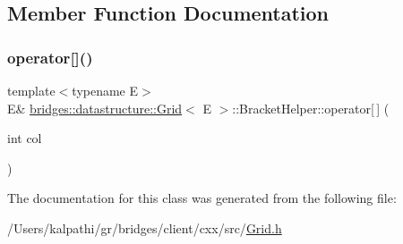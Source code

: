 \subsection{Member Function Documentation}
\mbox{\label{classbridges_1_1datastructure_1_1_grid_1_1_bracket_helper_a4cf644b40ea05506e98f7f0863245ecb}} 
\subsubsection{\texorpdfstring{operator[]()}{operator[]()}}
{\footnotesize\ttfamily template$<$typename E$>$ \\
E\& \mbox{\hyperlink{classbridges_1_1datastructure_1_1_grid}{bridges\+::datastructure\+::\+Grid}}$<$ E $>$\+::Bracket\+Helper\+::operator\mbox{[}$\,$\mbox{]} (\begin{DoxyParamCaption}\item[{int}]{col }\end{DoxyParamCaption})\hspace{0.3cm}{\ttfamily [inline]}}



The documentation for this class was generated from the following file\+:\begin{DoxyCompactItemize}
\item 
/\+Users/kalpathi/gr/bridges/client/cxx/src/\mbox{\hyperlink{_grid_8h}{Grid.\+h}}\end{DoxyCompactItemize}
